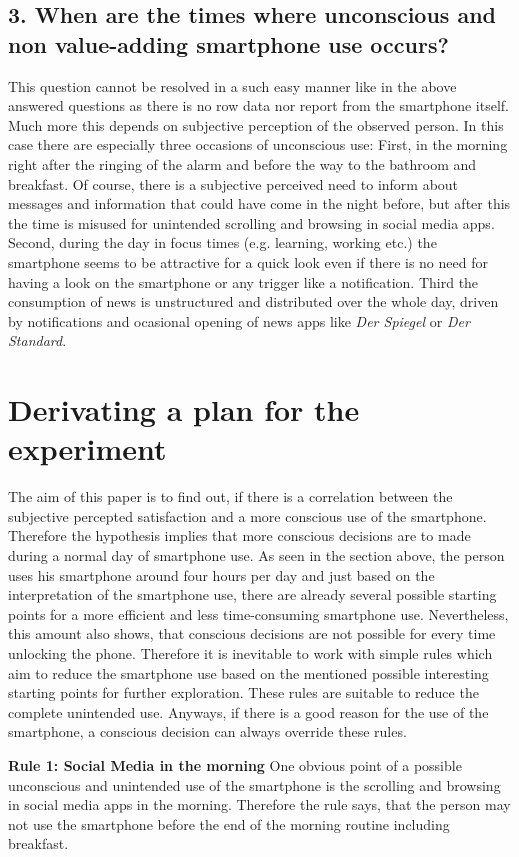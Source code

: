 \documentclass[11pt,letterpaper]{article}
\begin{document}
\subsection*{3. When are the times where unconscious and non value-adding smartphone use occurs?}
This question cannot be resolved in a such easy manner like in the above answered questions as there is no row data nor report from the smartphone itself. Much more this depends on subjective perception of the observed person. In this case there are especially three occasions of unconscious use: First, in the morning right after the ringing of the alarm and before the way to the bathroom and breakfast. Of course, there is a subjective perceived need to inform about messages and information that could have come in the night before, but after this the time is misused for unintended scrolling and browsing in social media apps. Second, during the day in focus times (e.g. learning, working etc.) the smartphone seems to be attractive for a quick look even if there is no need for having a look on the smartphone or any trigger like a notification. Third the consumption of news is unstructured and distributed over the whole day, driven by notifications and ocasional opening of news apps like \textit{Der Spiegel} or \textit{Der Standard}.

\section*{Derivating a plan for the experiment}
The aim of this paper is to find out, if there is a correlation between the subjective percepted satisfaction and a more conscious use of the smartphone. Therefore the hypothesis implies that more conscious decisions are to made during a normal day of smartphone use. As seen in the section above, the person uses his smartphone around four hours per day and just based on the interpretation of the smartphone use, there are already several possible starting points for a more efficient and less time-consuming smartphone use. Nevertheless, this amount also shows, that conscious decisions are not possible for every time unlocking the phone. Therefore it is inevitable to work with simple rules which aim to reduce the smartphone use based on the mentioned possible interesting starting points for further exploration. These rules are suitable to reduce the complete unintended use. Anyways, if there is a good reason for the use of the smartphone, a conscious decision can always override these rules.

\textbf{Rule 1: Social Media in the morning}
One obvious point of a possible unconscious and unintended use of the smartphone is the scrolling and browsing in social media apps in the morning. Therefore the rule says, that the person may not use the smartphone before the end of the morning routine including breakfast. \newline
\end{document}
